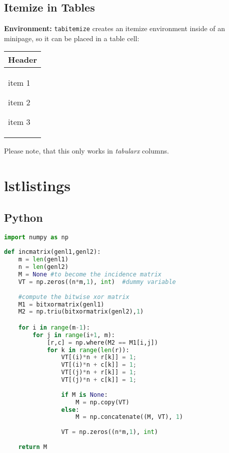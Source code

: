 \documentclass[10pt]{article}
\newcommand{\environmentcmd}[1]{\par\noindent\textbf{Environment:} \lstinline{#1}}
\begin{document}
\subsection{Itemize in Tables}
\environmentcmd{tabitemize} creates an itemize environment inside of an minipage, so it can be placed in a table cell:

\begin{table}[!h]
  \centering
  \begin{tabularx}{0.5\linewidth}{Y}
    \toprule
    Header            \\
    \midrule
    \begin{tabitemize}
      \item item 1
      \item item 2
      \item item 3
    \end{tabitemize} \\
    \bottomrule
  \end{tabularx}
\end{table}

Please note, that this only works in \emph{tabularx} columns.

\section{lstlistings}

\subsection{Python}
\begin{lstlisting}[caption=Example in Python,language=python]
import numpy as np
    
def incmatrix(genl1,genl2):
    m = len(genl1)
    n = len(genl2)
    M = None #to become the incidence matrix
    VT = np.zeros((n*m,1), int)  #dummy variable
    
    #compute the bitwise xor matrix
    M1 = bitxormatrix(genl1)
    M2 = np.triu(bitxormatrix(genl2),1) 

    for i in range(m-1):
        for j in range(i+1, m):
            [r,c] = np.where(M2 == M1[i,j])
            for k in range(len(r)):
                VT[(i)*n + r[k]] = 1;
                VT[(i)*n + c[k]] = 1;
                VT[(j)*n + r[k]] = 1;
                VT[(j)*n + c[k]] = 1;
                
                if M is None:
                    M = np.copy(VT)
                else:
                    M = np.concatenate((M, VT), 1)
                
                VT = np.zeros((n*m,1), int)
    
    return M
\end{lstlisting}
\end{document}

